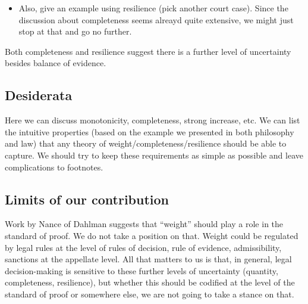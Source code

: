 \documentclass[
  10pt,
  dvipsnames,enabledeprecatedfontcommands]{scrartcl}
\begin{document}
\begin{itemize}
\item Also, give an example using resilience (pick another court case). Since the discussion about completeness 
seems alreayd quite extensive, we might just stop at that and go no further. 

\end{itemize}

Both completeness and resilience suggest there is a further level of
uncertainty besides balance of evidence.

\hypertarget{desiderata}{%
\subsection{Desiderata}\label{desiderata}}

Here we can discuss monotonicity, completeness, strong increase, etc. We
can list the intuitive properties (based on the example we presented in
both philosophy and law) that any theory of
weight/completeness/resilience should be able to capture. We should try
to keep these requirements as simple as possible and leave complications
to footnotes.

\hypertarget{limits-of-our-contribution}{%
\subsection{Limits of our
contribution}\label{limits-of-our-contribution}}

Work by Nance of Dahlman suggests that ``weight'' should play a role in
the standard of proof. We do not take a position on that. Weight could
be regulated by legal rules at the level of rules of decision, rule of
evidence, admissibility, sanctions at the appellate level. All that
matters to us is that, in general, legal decision-making is sensitive to
these further levels of uncertainty (quantity, completeness,
resilience), but whether this should be codified at the level of the
standard of proof or somewhere else, we are not going to take a stance
on that.
\end{document}
